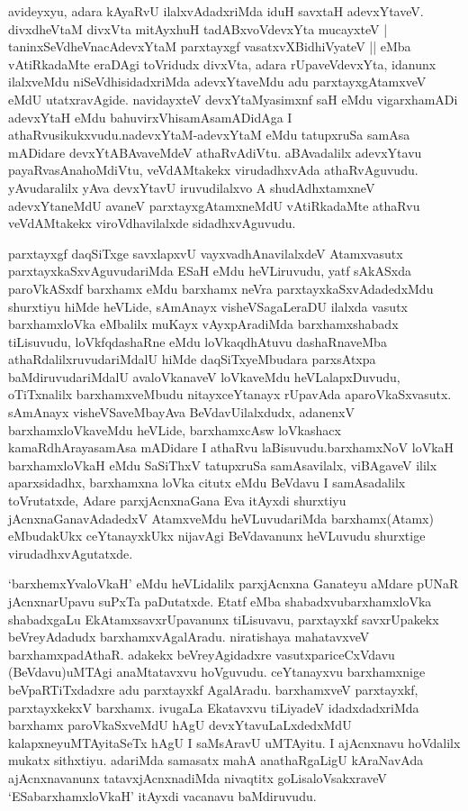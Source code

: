 \begin{artha}
avideyxyu, adara kAyaRvU ilalxvAdadxriMda iduH savxtaH adevxYtaveV. divxdheVtaM divxVta mitAyxhuH tadABxvoVdevxYta mucayxteV |
taninxSeVdheVnacAdevxYtaM parxtayxgf vasatxvXBidhiVyateV || eMba vAtiRkadaMte eraDAgi toVridudx divxVta, adara rUpaveVdevxYta, idanunx ilalxveMdu niSeVdhisidadxriMda adevxYtaveMdu adu parxtayxgAtamxveV eMdU utatxravAgide. navidayxteV devxYtaMyasimxnf saH eMdu vigarxhamADi adevxYtaH eMdu bahuvirxVhisamAsamADidAga I athaRvusikukxvudu.\break nadevxYtaM-adevxYtaM eMdu tatupxruSa samAsa mADidare devxYtABAvaveMdeV athaRvAdiVtu. aBAvadalilx adevxYtavu payaRvasAna\break hoMdiVtu, veVdAMtakekx virudadhxvAda athaRvAguvudu. yAvudaralilx yAva devxYtavU iruvudilalxvo A shudAdhxtamxneV adevxYtaneMdU avaneV parxtayxgAtamxneMdU vAtiRkadaMte athaRvu veVdAMtakekx viroVdhavilalxde sidadhxvAguvudu. 
\end{artha}%


\begin{artha}
parxtayxgf daqSiTxge savxlapxvU vayxvadhAnavilalxdeV Atamxvasutx parxtayxkaSxvAguvudariMda ESaH eMdu heVLiruvudu, yatf sAkASxda paroVkASxdf barxhamx eMdu barxhamx neVra parxtayxkaSxvAdadedxMdu shurxtiyu hiMde heVLide, sAmAnayx visheVSagaLeraDU ilalxda vasutx barxhamxloVka eMbalilx muKayx vAyxpAradiMda barxhamxshabadx tiLisuvudu, loVkfqdashaRne eMdu loVkaqdhAtuvu dashaRnaveMba athaRdalilxruvudariMdalU hiMde daqSiTx\-\break yeMbudara parxsAtxpa baMdiruvudariMdalU avaloVkanaveV loVkaveMdu heVLalapxDuvudu, oTiTxnalilx barxhamxveMbudu nitayxceYtanayx rUpavAda aparoVkaSxvasutx. sAmAnayx visheVSaveMbayAva BeVdavU\break ilalxdudx, adanenxV barxhamxloVkaveMdu heVLide, barxhamxcAsw loVkashacx kamaRdhArayasamAsa mADidare I athaRvu laBisuvudu.\break barxhamxNoV loVkaH barxhamxloVkaH eMdu SaSiThxV tatupxruSa samAsavilalx, viBAgaveV ililx aparxsidadhx, barxhamxna loVka citutx eMdu BeVdavu I samAsadalilx toVrutatxde, Adare parxjAcnxnaGana Eva itAyxdi shurxtiyu jAcnxnaGanavAdadedxV AtamxveMdu heVLuvudariMda barxhamx(Atamx) eMbudakUkx ceYtanayxkUkx nijavAgi BeVdavanunx heVLuvudu shurxtige virudadhxvAgutatxde.
\end{artha}

\begin{artha}%
`barxhemxYvaloVkaH' eMdu heVLidalilx parxjAcnxna Ganateyu aMdare pUNaR jAcnxnarUpavu suPxTa paDutatxde. Etatf eMba shabadxvu\break barxhamxloVka shabadxgaLu EkAtamxsavxrUpavanunx tiLisuvavu, parxtayxkf savxrUpakekx beVreyAdadudx barxhamxvAgalAradu. niratishaya mahatavxveV barxhamx\break padAthaR. adakekx beVreyAgidadxre vasutxpariceCxVdavu (BeVdavu)\break uMTAgi anaMtatavxvu hoVguvudu. ceYtanayxvu barxhamxnige beVpaRTiTxdadxre adu parxtayxkf AgalAradu. barxhamxveV parxtayxkf, parxtayxkekxV barxhamx. ivugaLa Ekatavxvu tiLiyadeV idadxdadxriMda barxhamx paroVkaSxveMdU hAgU devxYtavuLaLxdedxMdU kalapxneyuMTAyitaSeTx hAgU I saMsAravU uMTAyitu. I ajAcnxnavu hoVdalilx mukatx sithxtiyu. adariMda samasatx mahA anathaRgaLigU kAraNavAda ajAcnxnavanunx tatavxjAcnxnadiMda nivaqtitx goLisaloVsakxraveV `ESabarxhamxloVkaH' itAyxdi vacanavu baMdiruvudu. 
\end{artha}

